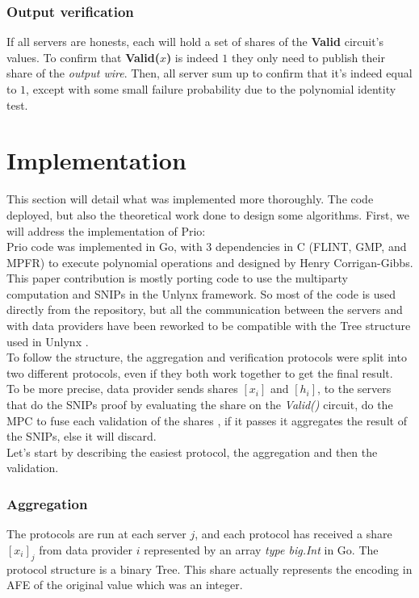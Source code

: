 \documentclass{article}
\begin{document}
\subsubsection{Output verification}
If all servers are honests, each will hold a set of shares of the \textbf{Valid} circuit's values. To confirm that \textbf{Valid($x$)} is indeed $1$ they only need to publish their share of the \textit{output wire}. Then, all server sum up to confirm that it's indeed equal to $1$, except with some small failure probability due to the polynomial identity test.


\section{Implementation}
This section will detail what was implemented more thoroughly. The code deployed, but also the theoretical work done to design some algorithms.
First, we will address the implementation of Prio:\\

Prio code \cite{priocode} was implemented in Go, with 3 dependencies in C (FLINT, GMP, and MPFR) to execute polynomial operations and designed by Henry Corrigan-Gibbs.\\
This paper contribution is mostly porting code to use the multiparty computation and SNIPs in the Unlynx framework. So most of the code is used directly from the repository, but all the communication between the servers and with data providers have been reworked to be compatible with the Tree structure used in Unlynx \cite{unlynxcode}.\\
To follow the structure, the aggregation and verification protocols were split into two different protocols, even if they both work together to get the final result.\\
To be more precise, data provider sends shares $[x_i]$ and $[h_i]$, to the servers that do the SNIPs proof by evaluating the share on the \textit{Valid()} circuit, do the MPC to fuse each validation of the shares , if it passes it aggregates the result of the SNIPs, else it will discard.\\
Let's start by describing the easiest protocol, the aggregation and then the validation.\\
\subsubsection*{Aggregation}
The protocols are run at each server $j$, and each protocol has received a share $[x_i]_j$ from data provider $i$ represented by an array \textit{type big.Int} in Go. The protocol structure is a binary Tree.
This share actually represents the encoding in AFE of the original value which was an integer.\\
\end{document}
